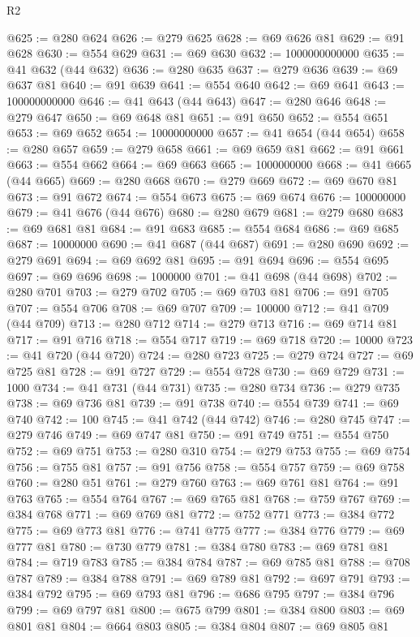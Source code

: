 \begin{lexlean}{R2}
\begin{coremodule}
{{{{{{{{{{{{{{{{{{{{{{{{{{{{{{{{{{{{{{{{{{{{{{@625 := @280 @624
@626 := @279 @625
@628 := @69 @626 @81
@629 := @91 @628
@630 := @554 @629
@631 := @69 @630
@632 := 1000000000000
@635 := @41 @632 (@44 @632)
@636 := @280 @635
@637 := @279 @636
@639 := @69 @637 @81
@640 := @91 @639
@641 := @554 @640
@642 := @69 @641
@643 := 100000000000
@646 := @41 @643 (@44 @643)
@647 := @280 @646
@648 := @279 @647
@650 := @69 @648 @81
@651 := @91 @650
@652 := @554 @651
@653 := @69 @652
@654 := 10000000000
@657 := @41 @654 (@44 @654)
@658 := @280 @657
@659 := @279 @658
@661 := @69 @659 @81
@662 := @91 @661
@663 := @554 @662
@664 := @69 @663
@665 := 1000000000
@668 := @41 @665 (@44 @665)
@669 := @280 @668
@670 := @279 @669
@672 := @69 @670 @81
@673 := @91 @672
@674 := @554 @673
@675 := @69 @674
@676 := 100000000
@679 := @41 @676 (@44 @676)
@680 := @280 @679
@681 := @279 @680
@683 := @69 @681 @81
@684 := @91 @683
@685 := @554 @684
@686 := @69 @685
@687 := 10000000
@690 := @41 @687 (@44 @687)
@691 := @280 @690
@692 := @279 @691
@694 := @69 @692 @81
@695 := @91 @694
@696 := @554 @695
@697 := @69 @696
@698 := 1000000
@701 := @41 @698 (@44 @698)
@702 := @280 @701
@703 := @279 @702
@705 := @69 @703 @81
@706 := @91 @705
@707 := @554 @706
@708 := @69 @707
@709 := 100000
@712 := @41 @709 (@44 @709)
@713 := @280 @712
@714 := @279 @713
@716 := @69 @714 @81
@717 := @91 @716
@718 := @554 @717
@719 := @69 @718
@720 := 10000
@723 := @41 @720 (@44 @720)
@724 := @280 @723
@725 := @279 @724
@727 := @69 @725 @81
@728 := @91 @727
@729 := @554 @728
@730 := @69 @729
@731 := 1000
@734 := @41 @731 (@44 @731)
@735 := @280 @734
@736 := @279 @735
@738 := @69 @736 @81
@739 := @91 @738
@740 := @554 @739
@741 := @69 @740
@742 := 100
@745 := @41 @742 (@44 @742)
@746 := @280 @745
@747 := @279 @746
@749 := @69 @747 @81
@750 := @91 @749
@751 := @554 @750
@752 := @69 @751
@753 := @280 @310
@754 := @279 @753
@755 := @69 @754
@756 := @755 @81
@757 := @91 @756
@758 := @554 @757
@759 := @69 @758
@760 := @280 @51
@761 := @279 @760
@763 := @69 @761 @81
@764 := @91 @763
@765 := @554 @764
@767 := @69 @765 @81
@768 := @759 @767
@769 := @384 @768
@771 := @69 @769 @81
@772 := @752 @771
@773 := @384 @772
@775 := @69 @773 @81
@776 := @741 @775
@777 := @384 @776
@779 := @69 @777 @81
@780 := @730 @779
@781 := @384 @780
@783 := @69 @781 @81
@784 := @719 @783
@785 := @384 @784
@787 := @69 @785 @81
@788 := @708 @787
@789 := @384 @788
@791 := @69 @789 @81
@792 := @697 @791
@793 := @384 @792
@795 := @69 @793 @81
@796 := @686 @795
@797 := @384 @796
@799 := @69 @797 @81
@800 := @675 @799
@801 := @384 @800
@803 := @69 @801 @81
@804 := @664 @803
@805 := @384 @804
@807 := @69 @805 @81
}}}}}}}}}}}}}}}}}}}}}}}}}}}}}}}}}}}}}}}}}}}}}}
\end{coremodule}
\end{lexlean}
